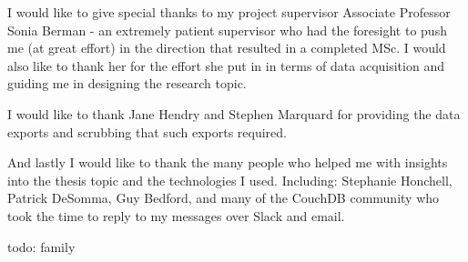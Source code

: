 I would like to give special thanks to my project supervisor Associate Professor Sonia Berman - an extremely patient supervisor who had the foresight to push me (at great effort) in the direction that resulted in a completed MSc. I would also like to thank her for the effort she put in in terms of data acquisition and guiding me in designing the research topic.

I would like to thank Jane Hendry and Stephen Marquard for providing the data exports and scrubbing that such exports required.

And lastly I would like to thank the many people who helped me with insights into the thesis topic and the technologies I used. Including: Stephanie Honchell, Patrick DeSomma, Guy Bedford, and many of the CouchDB community who took the time to reply to my messages over Slack and email.

todo: family